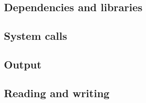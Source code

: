 

\subsection{Dependencies and libraries}

\subsection{System calls}

\subsection{Output}

\subsection{Reading and writing}

